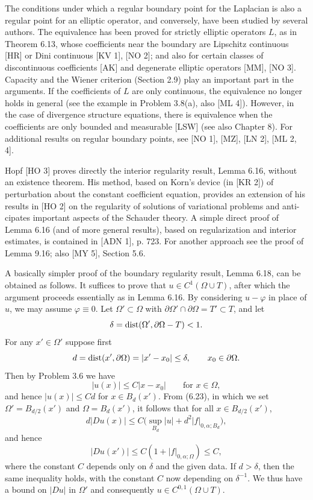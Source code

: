 The conditions under which a regular boundary point for the Laplacian is also a regular point for an elliptic operator, and conversely, have been studied by several authors. The equivalence has been proved for strictly elliptic operators $L$, as in Theorem 6.13, whose coefficients near the boundary are Lipschitz continuous [HR] or Dini continuous [KV 1], [NO 2]; and also for certain classes of discontinuous coefficients [AK] and degenerate elliptic operators [MM], [NO 3]. Capacity and the Wiener criterion (Section 2.9) play an important part in the arguments. If the coefficients of $L$ are only continuous, the equivalence no longer holds in general (see the example in Problem 3.8(a), also [ML 4]). However, in the case of divergence structure equations, there is equivalence when the coefficients are only bounded and measurable [LSW] (see also Chapter 8). For additional results on regular boundary points, see [NO 1], [MZ], [LN 2], [ML 2, 4].


Hopf [HO 3] proves directly the interior regularity result, Lemma 6.16,
without an existence theorem. His method, based on Korn's device (in [KR 2]) of
perturbation about the constant coefficient equation, provides an extension of his
results in [HO 2] on the regularity of solutions of variational problems and anti-
cipates important aspects of the Schauder theory. A simple direct proof of Lemma
6.16 (and of more general results), based on regularization and interior estimates,
is contained in [ADN 1], p. 723. For another approach see the proof of Lemma 9.16;
also [MY 5], Section 5.6.

A basically simpler proof of the boundary regularity result, Lemma 6.18, can
be obtained as follows. It suffices to prove that $u \in C^1(\Omega \cup T)$, after which the
argument proceeds essentially as in Lemma 6.16. By considering $u-\varphi$ in place
of $u$, we may assume $\varphi \equiv 0$. Let $\Omega' \subset \Omega$ with $\partial\Omega' \cap \partial\Omega = T' \subset T$, and let
\[
\delta = \operatorname{dist}(\Omega',\partial\Omega-T)<1.
\]
For any $x' \in \Omega'$ suppose first
\[
d=\operatorname{dist}(x',\partial\Omega)=|x'-x_0|\le \delta,\qquad x_0 \in \partial\Omega.
\]
Then by Problem 3.6 we have
\[
|u(x)|\le C|x-x_0| \qquad \text{for } x \in \Omega,
\]
and hence $|u(x)|\le Cd$ for $x \in B_d(x')$. From (6.23), in which we set $\Omega' = B_{d/2}(x')$
and $\Omega = B_d(x')$, it follows that for all $x \in B_{d/2}(x')$,
\[
d|Du(x)|\le C\bigl(\sup_{B_d}|u|+d^2|f|_{0,\alpha;B_d}\bigr),
\]
and hence
\[
|Du(x')|\le C(1+|f|_{0,\alpha;\Omega})\le C,
\]
where the constant $C$ depends only on $\delta$ and the given data. If $d>\delta$, then the same
inequality holds, with the constant $C$ now depending on $\delta^{-1}$. We thus have a
bound on $|Du|$ in $\Omega'$ and consequently $u \in C^{0,1}(\Omega \cup T)$.


